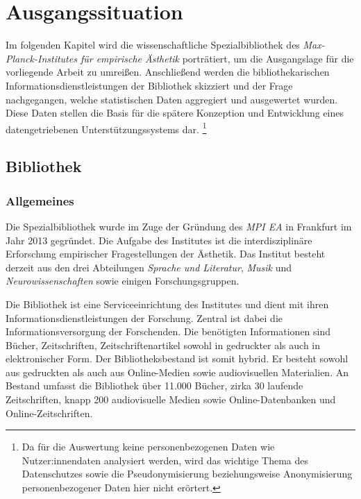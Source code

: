 \chapter{Ausgangssituation}
\label{chap:three}
Im folgenden Kapitel wird die wissenschaftliche Spezialbibliothek des \textit{Max-Planck-Institutes für empirische Ästhetik} porträtiert,
um die Ausgangslage für die vorliegende Arbeit zu umreißen.
Anschließend werden die bibliothekarischen Informationsdienstleistungen der Bibliothek skizziert und der Frage nachgegangen, 
welche statistischen Daten aggregiert und ausgewertet wurden. Diese Daten stellen die Basis für die spätere Konzeption und Entwicklung eines datengetriebenen Unterstützungssystems dar.
\footnote{Da für die Auswertung keine personenbezogenen Daten wie Nutzer:innendaten analysiert werden, wird das wichtige Thema des Datenschutzes sowie
die Pseudonymisierung beziehungsweise Anonymisierung personenbezogener Daten hier nicht erörtert.} 

\section{Bibliothek}
\label{chap:three_one}
\subsection{Allgemeines}
Die Spezialbibliothek wurde im Zuge der Gründung des \textit{\acrshort{MPI EA}}
in Frankfurt im Jahr 2013 gegründet. Die Aufgabe des Institutes ist die interdisziplinäre Erforschung 
empirischer Fragestellungen der Ästhetik. Das Institut besteht derzeit aus den drei Abteilungen \textit{Sprache und Literatur}, 
\textit{Musik} und \textit{Neurowissenschaften} sowie einigen Forschungsgruppen. %



Die Bibliothek ist eine Serviceeinrichtung des Institutes und dient mit ihren Informationsdienstleistungen 
der Forschung.
Zentral ist dabei die Informationsversorgung der Forschenden. Die benötigten Informationen sind Bücher, 
Zeitschriften, Zeitschriftenartikel sowohl in gedruckter als auch in elektronischer Form.
Der Bibliotheksbestand ist somit hybrid. Er besteht sowohl aus gedruckten als auch aus Online-Medien sowie 
audiovisuellen Materialien. An Bestand umfasst die Bibliothek über 11.000 Bücher, zirka 30 laufende Zeitschriften, 
knapp 200 audiovisuelle Medien sowie Online-Datenbanken und Online-Zeitschriften.

